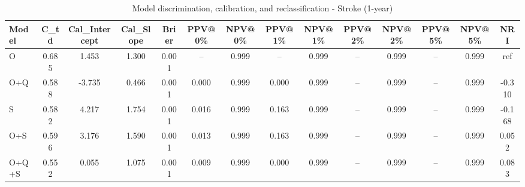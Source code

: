 \begin{table}[htbp]
\centering
\small
\caption{Model discrimination, calibration, and reclassification - Stroke (1-year)}
\label{tab:perf_stroke_1y}
\begin{tabular}{lccccccccccccc}
\toprule
Model & C\_td & Cal\_Intercept & Cal\_Slope & Brier & PPV@0\% & NPV@0\% & PPV@1\% & NPV@1\% & PPV@2\% & NPV@2\% & PPV@5\% & NPV@5\% & NRI \\
\midrule
O & 0.685 & 1.453 & 1.300 & 0.001 & -- & 0.999 & -- & 0.999 & -- & 0.999 & -- & 0.999 & ref \\
O+Q & 0.588 & -3.735 & 0.466 & 0.001 & 0.000 & 0.999 & 0.000 & 0.999 & -- & 0.999 & -- & 0.999 & -0.310 \\
S & 0.582 & 4.217 & 1.754 & 0.001 & 0.016 & 0.999 & 0.163 & 0.999 & -- & 0.999 & -- & 0.999 & -0.168 \\
O+S & 0.596 & 3.176 & 1.590 & 0.001 & 0.013 & 0.999 & 0.163 & 0.999 & -- & 0.999 & -- & 0.999 & 0.052 \\
O+Q+S & 0.552 & 0.055 & 1.075 & 0.001 & 0.009 & 0.999 & 0.000 & 0.999 & -- & 0.999 & -- & 0.999 & 0.083 \\
\bottomrule
\end{tabular}
\end{table}